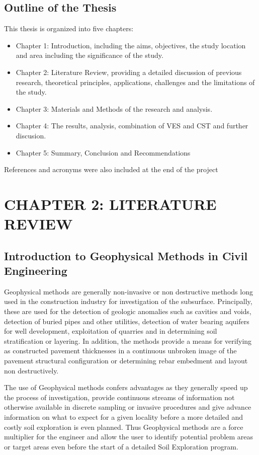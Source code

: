\documentclass[12pt,a4paper]{report}
\begin{document}
\newpage
\section{Outline of the Thesis}
This thesis is organized into five chapters:
\begin{itemize}
    \item Chapter 1: Introduction, including the aims, objectives, the study location and area including the significance of the study.
    \item Chapter 2: Literature Review, providing a detailed discussion of previous research, theoretical principles, applications, challenges and the limitations of the study.
    \item Chapter 3: Materials and Methods of the research and analysis.
    \item Chapter 4: The results, analysis, combination of VES and CST and further discusion.
    \item Chapter 5: Summary, Conclusion and Recommendations
\end{itemize}
References and acronyms were also included at the end of the project

\chapter{CHAPTER 2: LITERATURE REVIEW}

\section{Introduction to Geophysical Methods in Civil Engineering}
Geophysical methods are generally non-invasive or non destructive methods long used in the construction industry for investigation of the subsurface. Principally, these are used for the detection of geologic anomalies such as cavities and voids, detection of buried pipes and other utilities, detection of water bearing aquifers for well development, exploitation of quarries and in determining soil stratification or layering. In addition, the methods provide a means for verifying as constructed pavement thicknesses in a continuous unbroken image of the pavement structural configuration or determining rebar embedment and layout non destructively.

The use of Geophysical methods confers advantages as they generally speed up the process of investigation, provide continuous streams of information not otherwise available in discrete sampling or invasive procedures and give advance information on what to expect for a given locality before a more detailed and costly soil exploration is even planned. Thus Geophysical methods are a force multiplier for the engineer and allow the user to identify potential problem areas or target areas even before the start of a detailed Soil Exploration program.
\end{document}
